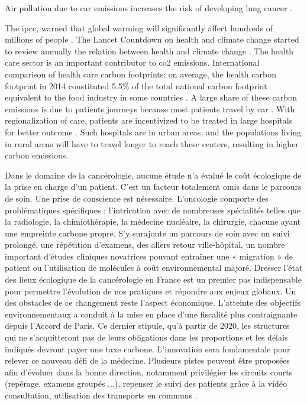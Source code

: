 Air pollution due to car emissions increases the risk of developing lung cancer \cite{raaschou-nielsen_air_2013}.

The \ac{ipcc}, warned that global warming will significantly affect hundreds of millions of people \cite{change_climate_2015}.
The Lancet Countdown on health and climate change started to review annually the relation between health and climate change \cite{watts_2020_2021}.
The health care sector is an important contributor to \ac{co2} emissions. International comparison of health care carbon footprints: on average, the health carbon footprint in 2014 constituted 5.5\% of the total national carbon footprint equivalent to the food industry in some countries \cite{pichler_international_2019}.
A large share of these carbon emissions is due to patients journeys \cite{andrews_carbon_2013,nicolet_what_2022} because most patients travel by car \cite{forner_carbon_2021}. With regionalization of care, patients are incentivized to be treated in large hospitals for better outcome \cite{eskander_health_2016}. Such hospitals are in urban areas, and the populations living in rural areas will have to travel longer to reach these centers, resulting in higher carbon emissions.

Dans le domaine de la cancérologie, aucune étude n'a évalué le coût écologique de la prise en charge d'un patient. C'est un facteur totalement omis dans le parcours de soin. Une prise de conscience est nécessaire. L'oncologie comporte des problématiques spécifiques : l'intrication avec de nombreuses spécialités telles que la radiologie, la chimiothérapie, la médecine nucléaire, la chirurgie, chacune ayant une empreinte carbone propre. S'y surajoute un parcours de soin avec un suivi prolongé, une répétition d'examens, des allers retour ville-hôpital, un nombre important d'études cliniques novatrices pouvant entraîner une « migration » de patient ou l'utilisation de molécules à coût environnemental majoré. Dresser l'état des lieux écologique de la cancérologie en France est un premier pas indispensable pour permettre l'évolution de nos pratiques et répondre aux enjeux globaux. Un des obstacles de ce changement reste l'aspect économique. L'atteinte des objectifs environnementaux a conduit à la mise en place d'une fiscalité plus contraignante depuis l'Accord de Paris. Ce dernier stipule, qu'à partir de 2020, les structures qui ne s'acquitteront pas de leurs obligations dans les proportions et les délais indiqués devront payer une taxe carbone. L'innovation sera fondamentale pour relever ce nouveau défi de la médecine. Plusieurs pistes peuvent être proposées afin d'évoluer dans la bonne direction, notamment privilégier les circuits courts (repérage, examens groupés ...), repenser le suivi des patients grâce à la vidéo consultation, utilisation des transports en communs \cite{guillon_empreinte_2020}.

